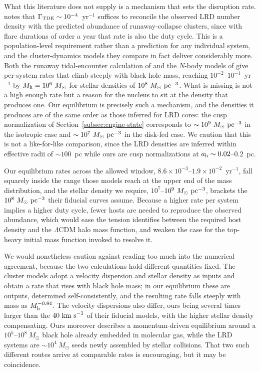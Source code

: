 \documentclass[preprint2]{aastex}
\newcommand{\msun}{M_{\odot}\xspace}
\begin{document}
What this literature does not supply is a mechanism that sets the disruption rate. \citet{Bellovary:2025a} notes that $\Gamma_{\rm TDE} \sim 10^{-4}$~yr$^{-1}$ suffices to reconcile the observed LRD number density with the predicted abundance of runaway-collapse clusters, since with flare durations of order a year that rate is also the duty cycle. This is a population-level requirement rather than a prediction for any individual system, and the cluster-dynamics models they compare in fact deliver considerably more. Both the runaway tidal-encounter calculation of \citet{Stone:2017a} and the $N$-body models of \citet{Rizzuto:2023a} give per-system rates that climb steeply with black hole mass, reaching $10^{-2}$--$10^{-1}$~yr$^{-1}$ by $M_{\rm h} = 10^{6}~\msun$ for stellar densities of $10^{8}~\msun~{\rm pc}^{-3}$. What is missing is not a high enough rate but a reason for the nucleus to sit at the density that produces one. Our equilibrium is precisely such a mechanism, and the densities it produces are of the same order as those inferred for LRD cores: the cusp normalization of Section~\ref{subsec:engine-state} corresponds to $\sim 10^{9}~\msun~{\rm pc}^{-3}$ in the isotropic case and $\sim 10^{7}~\msun~{\rm pc}^{-3}$ in the disk-fed case. We caution that this is not a like-for-like comparison, since the LRD densities are inferred within effective radii of $\sim 100$~pc while ours are cusp normalizations at $a_{\rm h} \sim 0.02$--$0.2$~pc.

Our equilibrium rates across the allowed window, $8.6 \times 10^{-3}$--$1.9 \times 10^{-2}$~yr$^{-1}$, fall squarely inside the range those models reach at the upper end of the mass distribution, and the stellar density we require, $10^{7}$--$10^{9}~\msun~{\rm pc}^{-3}$, brackets the $10^{8}~\msun~{\rm pc}^{-3}$ their fiducial curves assume. Because a higher rate per system implies a higher duty cycle, fewer hosts are needed to reproduce the observed abundance, which would ease the tension \citet{Bellovary:2025a} identifies between the required host density and the $\Lambda$CDM halo mass function, and weaken the case for the top-heavy initial mass function invoked to resolve it.

We would nonetheless caution against reading too much into the numerical agreement, because the two calculations hold different quantities fixed. The cluster models adopt a velocity dispersion and stellar density as inputs and obtain a rate that rises with black hole mass; in our equilibrium these are outputs, determined self-consistently, and the resulting rate falls steeply with mass as $M_{\rm h}^{-0.84}$. The velocity dispersions also differ, ours being several times larger than the $40~{\rm km~s}^{-1}$ of their fiducial models, with the higher stellar density compensating. Ours moreover describes a momentum-driven equilibrium around a $10^{5}$--$10^{8}~\msun$ black hole already embedded in molecular gas, while the LRD systems are $\sim 10^{4}~\msun$ seeds newly assembled by stellar collisions. That two such different routes arrive at comparable rates is encouraging, but it may be coincidence.
\end{document}
